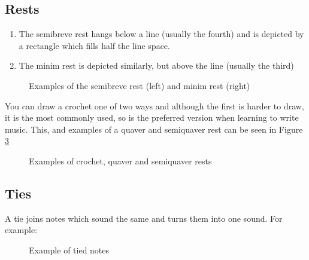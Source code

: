 \subsection*{Rests}

\begin{enumerate}
\item The semibreve rest hangs below a line (usually the fourth) and is depicted by a rectangle which fills half the line space.
\item The minim rest is depicted similarly, but above the line (usually the third)
\end{enumerate}

\begin{figure}[h!]
  \centering
  \caption{Examples of the semibreve rest (left) and minim rest (right)}
  \label{fig:RestMinimSemibreve}
\end{figure}

You can draw a crochet one of two ways and although the first is harder to draw, it is the most commonly used, so is the preferred version when learning to write music. This, and examples of a quaver and semiquaver rest can be seen in Figure \ref{fig:RestCrochetQS}

\begin{figure}[h!]
  \centering
  \caption{Examples of crochet, quaver and semiquaver rests}
  \label{fig:RestCrochetQS}
\end{figure}

\subsection* {Ties}

A tie joins notes which sound the same and turns them into one sound. For example:

\begin{figure}[h!]
  \centering
  \caption{Example of tied notes}
  \label{fig:RestCrochetQS}
\end{figure}


